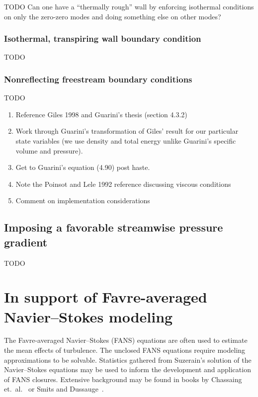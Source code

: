 \documentclass[letterpaper,11pt,nointlimits,reqno,draft]{amsart}
\begin{document}
TODO Can one have a ``thermally rough'' wall by enforcing isothermal conditions
on only the zero-zero modes and doing something else on other modes?

\subsubsection{Isothermal, transpiring wall boundary condition}

TODO

\subsubsection{Nonreflecting freestream boundary conditions}

TODO

\begin{enumerate}
\item Reference Giles 1998 and Guarini's thesis (section 4.3.2)
\item Work through Guarini's transformation of Giles' result for our particular state variables (we use density and total energy unlike Guarini's specific volume and pressure).
\item Get to Guarini's equation (4.90) post haste.
\item Note the Poinsot and Lele 1992 reference discussing viscous conditions
\item Comment on implementation considerations
\end{enumerate}

\subsection{Imposing a favorable streamwise pressure gradient}

TODO

\section{In support of Favre-averaged Navier--Stokes modeling}
\label{sec:supportFANS}

The Favre-averaged Navier--Stokes (FANS) equations are often used to estimate
the mean effects of turbulence.  The unclosed FANS equations require modeling
approximations to be solvable.  Statistics gathered from Suzerain's solution of
the Navier--Stokes equations may be used to inform the development and
application of FANS closures.  Extensive background may be found in
books by Chassaing et.~al.~\cite{Chassaing2010} or Smits and
Dussauge~\cite{SmitsDussauge2005}.
\end{document}
